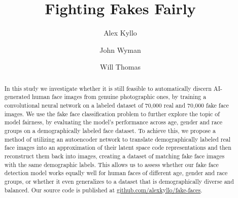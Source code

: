 \documentclass[11pt, letterpaper]{article}
\title{Fighting Fakes Fairly}
\author{
  Alex Kyllo
  \and
  John Wyman
  \and
  Will Thomas
}
\begin{document}
\maketitle

\begin{abstract}
  In this study we investigate whether it is still feasible to
  automatically discern AI-generated human face images from genuine
  photographic ones, by training a convolutional neural network on a
  labeled dataset of 70,000 real and 70,000 fake face images. We use
  the fake face classification problem to further explore the topic of
  model fairness, by evaluating the model's performance across age,
  gender and race groups on a demographically labeled face dataset. To
  achieve this, we propose a method of utilizing an autoencoder
  network to translate demographically labeled real face images into
  an approximation of their latent space code representations and then
  reconstruct them back into images, creating a dataset of matching
  fake face images with the same demographic labels. This allows us to
  assess whether our fake face detection model works equally well for
  human faces of different age, gender and race groups, or whether it
  even generalizes to a dataset that is demographically diverse and
  balanced. Our source code is published at
  \href{https://github.com/alexkyllo/fake-faces/}{github.com/alexkyllo/fake-faces}.
\end{abstract}
\end{document}
